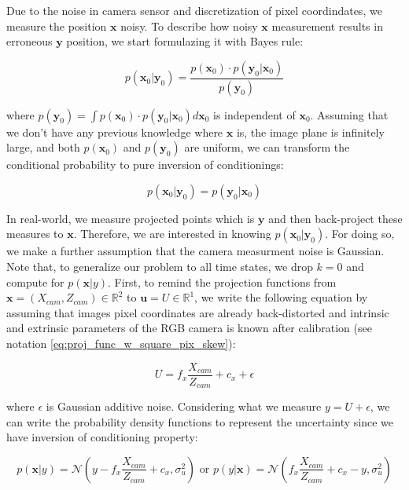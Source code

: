 \documentclass[a4paper]{report}
\numberwithin{figure}{section}
\newcommand{\R}{\mathbb{R}}
\begin{document}
Due to the noise in camera sensor and discretization of pixel coordindates, 
we measure the position $\mathbf{x}$ noisy. To describe how noisy $\mathbf{x}$ 
measurement results in erroneous $\mathbf{y}$ position, 
we start formulazing it with Bayes rule:

\begin{equation}
  p(\mathbf{x}_0|\mathbf{y}_0) = \frac{p(\mathbf{x}_0) \cdot p(\mathbf{y}_0|\mathbf{x}_0)}{p(\mathbf{y}_0)}
\end{equation}

where $p(\mathbf{y}_0) = \int p(\mathbf{x}_0) \cdot p(\mathbf{y}_0|\mathbf{x}_0) d\mathbf{x}_0$
is independent of $\mathbf{x}_0$. Assuming that we don't have any previous 
knowledge where $\mathbf{x}$ is, the image plane is infinitely 
large, and both $p(\mathbf{x}_0)$ and $p(\mathbf{y}_0)$ are uniform, we can transform 
the conditional probability to pure inversion of conditionings:

\begin{equation}
  p(\mathbf{x}_0|\mathbf{y}_0) = p(\mathbf{y}_0|\mathbf{x}_0)
\end{equation}

In real-world, we measure projected points which is $\mathbf{y}$ and then 
back-project these measures to $\mathbf{x}$. Therefore, we are interested in 
knowing $p(\mathbf{x}_0|\mathbf{y}_0)$. For doing so, we make a further 
assumption that the camera measurment noise is Gaussian. Note that, to generalize our 
problem to all time states, we drop $k=0$ and compute for $p(\mathbf{x}|y)$. 
First, to remind the projection functions from $\mathbf{x}=(X_{cam},Z_{cam}) \in \R^2$ to 
$\mathbf{u}=U \in \R^1$, we write the following equation by assuming that 
images pixel coordinates are already back-distorted and 
intrinsic and extrinsic parameters of the RGB camera is known after calibration
(see notation \ref{eq:proj_func_w_square_pix_skew}):

\begin{equation}
  U = f_x \frac{X_{cam}}{Z_{cam}} + c_x + \epsilon
\end{equation}

where $\epsilon$ is Gaussian additive noise. Considering what we measure 
$y=U+\epsilon$, we can write the probability density functions
to represent the uncertainty since we have inversion of conditioning property:

\begin{equation}
  p(\mathbf{x}|y) = \mathcal{N}(y-f_x \frac{X_{cam}}{Z_{cam}} + c_x, \sigma_u^2) \text{ or }
  p(y|\mathbf{x}) = \mathcal{N}(f_x \frac{X_{cam}}{Z_{cam}} + c_x-y, \sigma_u^2)
\end{equation}
\end{document}
